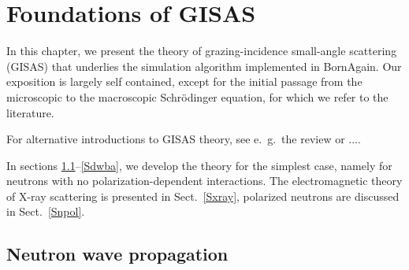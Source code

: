 
\let\v=\vect
\def\r{\v{r}}
\def\k{\v{k}}
\def\rD{\r_\text{D}}
\def\rS{\r_\text{S}}
\def\kD{\k_\text{D}}
\def\Sample{\mathcal{M}}
\def\Sphere{\mathcal{S}}

\chapter{Foundations of GISAS}  

\newcommand{\nz}{\overline{n}}

In this chapter,
we present the theory
of grazing-incidence small-angle scattering (GISAS)
that underlies the simulation algorithm implemented in BornAgain.
Our exposition is largely self contained,
except for the initial passage from the microscopic
to the macroscopic Schrödinger equation,
for which we refer to the literature.

For alternative introductions to GISAS theory,
see e.~g.\ the review \cite{ReLL09} or ....

In sections \ref{Swave}--\ref{Sdwba},
we develop the theory for the simplest case,
namely for neutrons with no polarization-dependent interactions.
The electromagnetic theory of X-ray scattering
is presented in Sect.~\ref{Sxray},
polarized neutrons are discussed in Sect.~\ref{Snpol}.

\section{Neutron wave propagation}\label{Swave}

